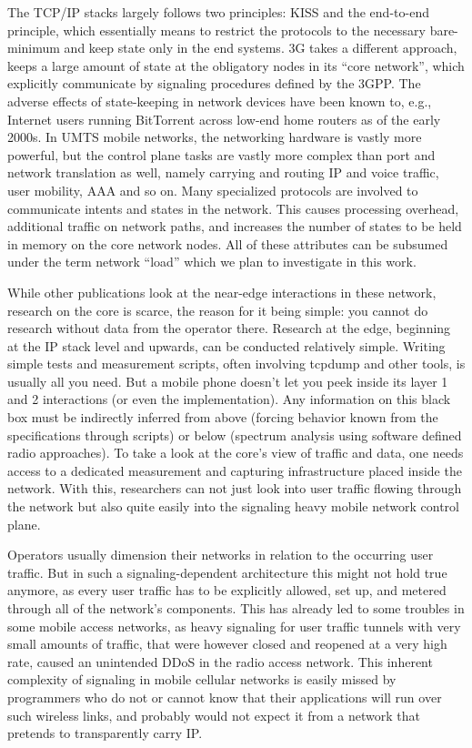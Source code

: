 The TCP/IP stacks largely follows two principles: \gls{KISS} and the end-to-end principle\cite{saltzer1984end2end}, which essentially means to restrict the protocols to the necessary bare-minimum and keep state only in the end systems. 3G takes a different approach, keeps a large amount of state at the obligatory nodes in its ``core network'', which explicitly communicate by signaling procedures defined by the \gls{3GPP}.
The adverse effects of state-keeping in network devices have been known to, e.g.,  Internet users running BitTorrent across low-end home routers as of the early 2000s. In \gls{UMTS} mobile networks, the networking hardware is vastly more powerful, but the control plane tasks are vastly more complex than port and network translation as well, namely carrying and routing IP and voice traffic, user mobility, \gls{AAA} and so on. Many specialized protocols are involved to communicate intents and states in the network. This causes processing overhead, additional traffic on network paths, and increases the number of states to be held in memory on the core network nodes. All of these attributes can be subsumed under the term network ``load'' which we plan to investigate in this work.

While other publications look at the near-edge interactions in these network, research on the core is scarce, the reason for it being simple: you cannot do research without data from the operator there. Research at the edge, beginning at the IP stack level and upwards, can be conducted relatively simple. Writing simple tests and measurement scripts, often involving tcpdump and other tools, is usually all you need. But a mobile phone doesn't let you peek inside its layer 1 and 2 interactions (or even the implementation). Any information on this black box must be indirectly inferred from above (forcing behavior known from the specifications through scripts) or below (spectrum analysis using software defined radio approaches). To take a look at the core's view of traffic and data, one needs access to a dedicated measurement and capturing infrastructure placed inside the network. With this, researchers can not just look into user traffic flowing through the network but also quite easily into the signaling heavy mobile network control plane. 

Operators usually dimension their networks in relation to the occurring user traffic. But in such a signaling-dependent architecture this might not hold true anymore, as every user traffic has to be explicitly allowed, set up, and metered through all of the network's components. This has already led to some troubles in some mobile access networks, as heavy signaling for user traffic tunnels with very small amounts of traffic, that were however closed and reopened at a very high rate, caused an unintended \gls{DDoS} in the radio access network\cite{lt2012docostorm, it2011birdandroid}. 
This inherent complexity of signaling in mobile cellular networks is easily missed by programmers who do not or cannot know that their applications will run over such wireless links, and probably would not expect it from a network that pretends to transparently carry IP.

